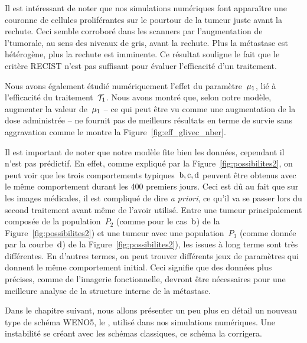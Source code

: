 \documentclass[main.tex]{subfiles}
\begin{document}
Il est intéressant de noter que nos simulations numériques font apparaître une couronne de cellules proliférantes sur le pourtour de la tumeur juste avant la rechute. Ceci semble corroboré dans les scanners par l'augmentation de l'\hetero tumorale, au sens des niveaux de gris, avant la rechute. Plus la métastase est hétérogène, plus la rechute est imminente. Ce résultat souligne le fait que le critère RECIST n'est pas suffisant pour évaluer l'efficacité d'un traitement.


Nous avons également étudié numériquement l'effet du paramètre~$\mu_1$, lié à l'efficacité du traitement~${\mathcal T_1}$. Nous avons montré que, selon notre modèle, augmenter la valeur de~$\mu_1$ -- ce qui peut être vu comme une augmentation de la dose administrée -- ne fournit pas de meilleurs résultats en terme de survie sans aggravation comme le montre la Figure~\ref{fig:eff_glivec_nber}.


Il est important de noter que notre modèle fite bien les données, cependant il n'est pas prédictif. En effet, comme expliqué par la Figure~\ref{fig:possibilites2}, on peut voir que les trois comportements typiques~$\rm{b,c,d}$ peuvent être obtenus avec le même comportement durant les 400 premiers jours. Ceci est dû au fait que sur les images médicales, il est compliqué de dire {\it a priori}, ce qu'il va se passer lors du second traitement avant même de l'avoir utilisé. 
Entre une tumeur principalement composée de la population~$P_2$ (comme pour le cas~${\rm b}$) de la Figure~\ref{fig:possibilites2}) et une tumeur avec une population~$P_3$ (comme donnée par la courbe~${\rm d}$) de la Figure~\ref{fig:possibilites2}), les issues à long terme sont très différentes. 
En d'autres termes, on peut trouver différents jeux de paramètres qui donnent le même comportement initial. Ceci signifie que des données plus précises, comme de l'imagerie fonctionnelle, devront être nécessaires pour une meilleure analyse de la structure interne de la métastase. 




Dans le chapitre suivant, nous allons présenter un peu plus en détail un nouveau type de schéma WENO5, le \twinweno, utilisé dans nos simulations numériques. Une instabilité se créant avec les schémas classiques, ce schéma la corrigera.
\end{document}
